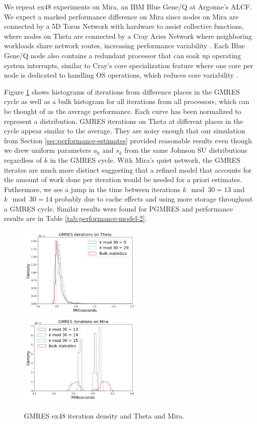 \documentclass[sigconf]{acmart}
\begin{document}
We repeat ex48 experiments on Mira, an IBM Blue Gene/Q \cite{kumaran2016introduction} at Argonne's ALCF.  
We expect a marked performance difference on Mira since 
nodes on Mira are connected by a 5D Torus Network with hardware to assist collective functions, 
where nodes on Theta are connected by a Cray Aries Network where neighboring workloads share network routes, increasing performance variability \cite{groves2017understanding}. 
Each Blue Gene/Q node also contains a redundant processor that can soak up operating system interrupts, similar to Cray's core specialization feature where one core per node is dedicated to handling OS operations, which reduces core variability \cite{chunduri2017run}.


Figure \ref{fig:mira} shows histograms of iterations from difference places in the GMRES cycle as well as a bulk histogram for all iterations from all processors, which can be thought of as the average performance. Each curve has been normalized to represent a distribution.  
GMRES iterations on Theta at different places in the cycle appear similar to the average. They are noisy enough that our simulation from Section \ref{sec:performance-estimates} provided reasonable results even though we drew uniform parameters $a_k$ and $s_k$ from the same Johnson SU distributions regardless of $k$ in the GMRES cycle. 
With Mira's quiet network, the GMRES iterates are much more distinct suggesting that a refined model that accounts for the amount of work done per iteration would be needed for a priori estimates.
Futhermore, we see a jump in the time between iterations $k \mod 30 = 13$ and $k \mod 30 = 14$ probably due to cache effects and using more storage throughout a GMRES cycle. 
Similar results were found for PGMRES and performance results are in Table \ref{tab:performance-model-2}.




\begin{figure}
\centering
\includegraphics[width=6cm]{../plots/GMRES_ex48_8192_1000000__bulk_statistics_with_k_mod_30_.png}
\includegraphics[width=6cm]{../plots/GMRES_MIRA_ex48_8192_1000000__bulk_statistics_with_k_mod_30_.png}
\caption{GMRES ex48 iteration density and Theta and Mira.}  \label{fig:mira}
\end{figure}
\end{document}
